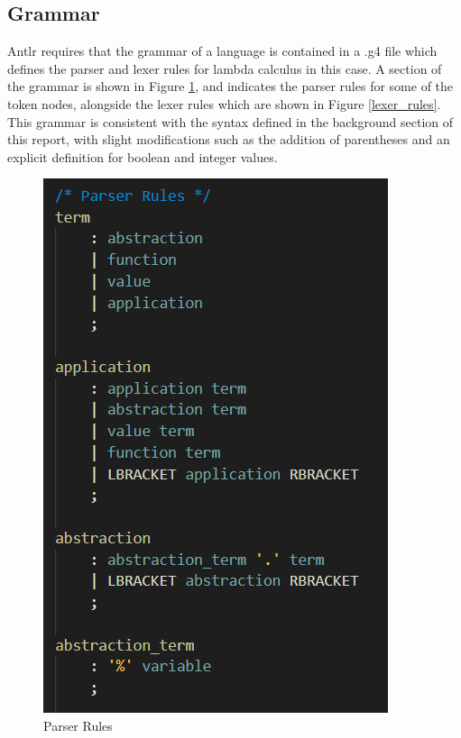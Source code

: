 \documentclass[a4paper,12pt]{report}
\begin{document}
\subsection{Grammar}

Antlr requires that the grammar of a language is contained in a .g4 file which defines the parser and lexer rules for lambda calculus in this case. A section of the grammar is shown in Figure \ref{parser_rules}, and indicates the parser rules for some of the token nodes, alongside the lexer rules which are shown in Figure \ref{lexer_rules}. This grammar is consistent with the syntax defined in the background section of this report, with slight modifications such as the addition of parentheses and an explicit definition for boolean and integer values.

\begin{figure}[p]
\centering
\includegraphics[scale=0.75]{images/parser_rules}
\caption{Parser Rules}
\label{parser_rules}
\end{figure}
\end{document}
